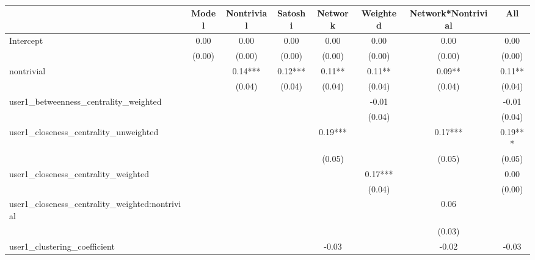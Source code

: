 \begin{table}
\caption{}
\begin{center}
\begin{tabular}{lccccccc}
\hline
                                               & Model    & Nontrivial & Satoshi & Network & Weighted & Network*Nontrivial &   All    \\
\hline
\hline

Intercept                                      & 0.00     & 0.00       & 0.00    & 0.00    & 0.00     & 0.00               & 0.00     \\
                                               & (0.00)   & (0.00)     & (0.00)  & (0.00)  & (0.00)   & (0.00)             & (0.00)   \\
nontrivial                                     &          & 0.14***    & 0.12*** & 0.11**  & 0.11**   & 0.09**             & 0.11**   \\
                                               &          & (0.04)     & (0.04)  & (0.04)  & (0.04)   & (0.04)             & (0.04)   \\
user1_betweenness_centrality_weighted          &          &            &         &         & -0.01    &                    & -0.01    \\
                                               &          &            &         &         & (0.04)   &                    & (0.04)   \\
user1_closeness_centrality_unweighted          &          &            &         & 0.19*** &          & 0.17***            & 0.19***  \\
                                               &          &            &         & (0.05)  &          & (0.05)             & (0.05)   \\
user1_closeness_centrality_weighted            &          &            &         &         & 0.17***  &                    & 0.00     \\
                                               &          &            &         &         & (0.04)   &                    & (0.00)   \\
user1_closeness_centrality_weighted:nontrivial &          &            &         &         &          & 0.06               &          \\
                                               &          &            &         &         &          & (0.03)             &          \\
user1_clustering_coefficient                   &          &            &         & -0.03   &          & -0.02              & -0.03    \\

\end{tabular}
\end{center}
\end{table}
